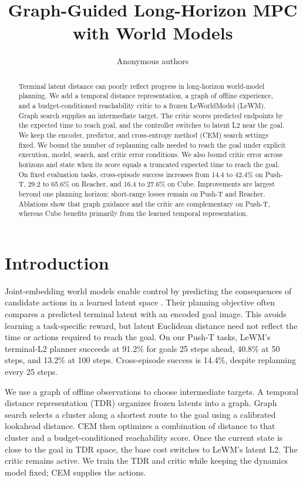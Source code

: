 \documentclass{article}
\title{Graph-Guided Long-Horizon MPC with World Models}
\author{Anonymous authors}
\theoremstyle{definition}
\theoremstyle{remark}
\begin{document}
\maketitle
\begin{abstract}
Terminal latent distance can poorly reflect progress in long-horizon world-model
planning. We add a temporal distance representation, a graph of offline experience,
and a budget-conditioned reachability critic to a frozen LeWorldModel (LeWM).
Graph search supplies an intermediate target. The critic scores predicted endpoints
by the expected time to reach goal, and the controller switches to latent L2 near the goal.
We keep the encoder, predictor, and cross-entropy method (CEM) search settings fixed.
We bound the number of replanning calls needed to reach the goal under explicit
execution, model, search, and critic error conditions. We also bound critic error
across horizons and state when its score equals a truncated expected time to reach the goal.
On fixed evaluation tasks, cross-episode success increases from 14.4 to 42.4\% on Push-T,
29.2 to 65.6\% on Reacher, and 16.4 to 27.6\% on Cube. Improvements are largest beyond one
planning horizon; short-range losses remain on Push-T and Reacher. Ablations show that
graph guidance and the critic are complementary on Push-T, whereas Cube benefits primarily
from the learned temporal representation.
\end{abstract}

\section{Introduction}
Joint-embedding world models enable control by predicting the consequences of candidate
actions in a learned latent space \citep{dinowm,lewm}. Their planning objective often compares a
predicted terminal latent with an encoded goal image. This avoids learning a task-specific
reward, but latent Euclidean distance need not reflect the time or actions required to reach
the goal. On our Push-T tasks, LeWM's terminal-L2 planner succeeds at 91.2\% for goals 25 steps
ahead, 40.8\% at 50 steps, and 13.2\% at 100 steps. Cross-episode success is 14.4\%, despite
replanning every 25 steps.

We use a graph of offline observations to choose intermediate targets.
A temporal distance representation (TDR) organizes frozen latents into a graph.
Graph search selects a cluster along a shortest route to the goal using a calibrated
lookahead distance. CEM then optimizes a combination of distance to that cluster and a
budget-conditioned reachability score. Once the current state is close to the goal in
TDR space, the base cost switches to LeWM's latent L2. The critic remains active.
We train the TDR and critic while keeping the dynamics model fixed; CEM supplies the actions.
\end{document}

